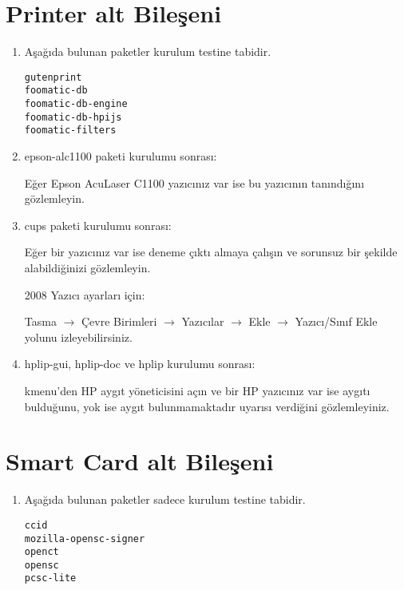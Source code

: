 \documentclass[a4paper,10pt]{article}
\begin{document}
\section{Printer alt Bileşeni}
\begin{enumerate}

\item Aşağıda bulunan paketler kurulum testine tabidir.
\begin{verbatim}
gutenprint 
foomatic-db
foomatic-db-engine
foomatic-db-hpijs
foomatic-filters
\end{verbatim}
\item epson-alc1100 paketi kurulumu sonrası:

Eğer Epson AcuLaser C1100 yazıcınız var ise bu yazıcının tanındığını gözlemleyin.

\item cups paketi kurulumu sonrası:

Eğer bir yazıcınız var ise deneme çıktı almaya çalışın ve sorunsuz bir şekilde alabildiğinizi gözlemleyin.

2008 Yazıcı ayarları için:

Tasma $\rightarrow$ Çevre Birimleri $\rightarrow$ Yazıcılar $\rightarrow$ Ekle $\rightarrow$ Yazıcı/Sınıf Ekle yolunu izleyebilirsiniz.

\item hplip-gui, hplip-doc ve hplip kurulumu sonrası:

kmenu'den HP aygıt yöneticisini açın ve bir HP yazıcınız var ise aygıtı bulduğunu, yok ise aygıt bulunmamaktadır uyarısı verdiğini gözlemleyiniz.
    
\end{enumerate}

\section{Smart Card alt Bileşeni}
\begin{enumerate}
 \item Aşağıda bulunan paketler sadece kurulum testine tabidir.
\begin{verbatim}
ccid 
mozilla-opensc-signer
openct
opensc
pcsc-lite
\end{verbatim}


\end{enumerate}
\end{document}

